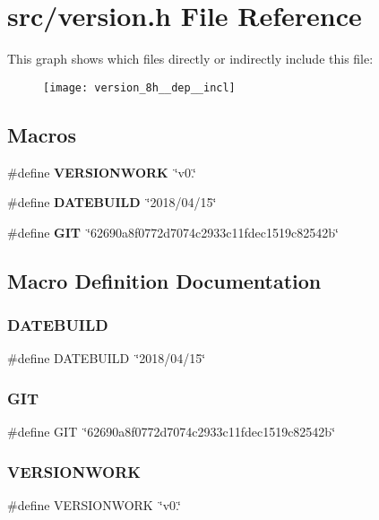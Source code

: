 \section{src/version.h File Reference}
\label{version_8h}
This graph shows which files directly or indirectly include this file\+:\nopagebreak
\begin{figure}[H]
\begin{center}
\leavevmode
\texttt{[image: version\_8h\_\_dep\_\_incl]}
\end{center}
\end{figure}
\subsection*{Macros}
\begin{DoxyCompactItemize}
\item 
\#define \textbf{ V\+E\+R\+S\+I\+O\+N\+W\+O\+RK}~\char`\"{}v0.\char`\"{}
\item 
\#define \textbf{ D\+A\+T\+E\+B\+U\+I\+LD}~\char`\"{}2018/04/15\char`\"{}
\item 
\#define \textbf{ G\+IT}~\char`\"{}62690a8f0772d7074c2933c11fdec1519c82542b\char`\"{}
\end{DoxyCompactItemize}


\subsection{Macro Definition Documentation}
\mbox{\label{version_8h_ab53bd0b5d2c14973aabe7c8c22456dd3}} 
\subsubsection{D\+A\+T\+E\+B\+U\+I\+LD}
{\footnotesize\ttfamily \#define D\+A\+T\+E\+B\+U\+I\+LD~\char`\"{}2018/04/15\char`\"{}}

\mbox{\label{version_8h_a7d062720efcfb4918c0b10b9f3573a04}} 
\subsubsection{G\+IT}
{\footnotesize\ttfamily \#define G\+IT~\char`\"{}62690a8f0772d7074c2933c11fdec1519c82542b\char`\"{}}

\mbox{\label{version_8h_a9d09b820ab8ab1e6e808360969ca8c3e}} 
\subsubsection{V\+E\+R\+S\+I\+O\+N\+W\+O\+RK}
{\footnotesize\ttfamily \#define V\+E\+R\+S\+I\+O\+N\+W\+O\+RK~\char`\"{}v0.\char`\"{}}

